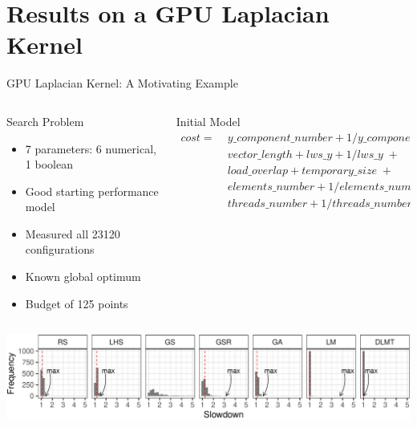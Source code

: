 \documentclass[10pt, compress, aspectratio=169, xcolor={table,usenames,dvipsnames}]{beamer}
\begin{document}
\section{Results on a GPU Laplacian Kernel}
\label{sec:org8c8128b}
\begin{frame}[label={sec:orgb5fe414}]{GPU Laplacian Kernel: A Motivating Example}
\begin{columns}
\begin{column}{0.5\columnwidth}
\begin{block}{Search Problem}
\begin{itemize}
\item 7 parameters: 6 \alert{numerical}, 1 \alert{boolean}
\item Good starting performance model
\item Measured all 23120 configurations
\item Known \alert{global optimum}
\item Budget of \alert{125 points}
\end{itemize}
\end{block}
\end{column}

\begin{column}{0.5\columnwidth}
\begin{block}{Initial Model}
\footnotesize
\begin{align*}
cost = & \; y\_component\_number + 1 / y\_component\_number \; + \\
& \; vector\_length + lws\_y + 1 / lws\_y \; + \\
& \; load\_overlap + temporary\_size \; + \\
& \; elements\_number + 1 / elements\_number \; + \\
& \; threads\_number + 1 / threads\_number
\end{align*}
\normalsize
\end{block}
\end{column}
\end{columns}

\vspace{-.3cm}


\vspace{-.3cm}

\begin{center}
\begin{center}
\includegraphics[width=\columnwidth]{../../../img/comparison_histogram.pdf}
\end{center}
\end{center}
\end{frame}
\end{document}
